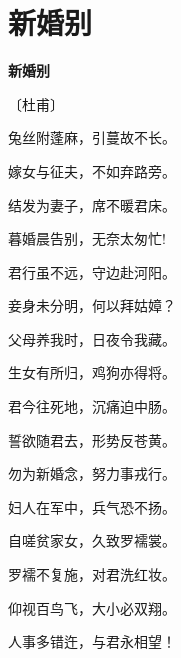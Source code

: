 \documentclass[12pt,UTF-8,openany,fontset=none]{ctexbook}
\begin{document}
\vspace{8pt}
\clearpage

\section{新婚别}


\begin{center}
    {\bfseries 新婚别}

    \vspace{18pt}

    \begin{large}\xuwen
        〔杜甫〕
    \end{large}

\end{center}

    \vspace{18pt}  %

\begin{center}
    \begin{Large}

        兔丝附蓬麻，引蔓故不长。

        嫁女与征夫，不如弃路旁。

        结发为妻子，席不暖君床。

        暮婚晨告别，无奈太匆忙!

        君行虽不远，守边赴河阳。

        妾身未分明，何以拜姑嫜？

        父母养我时，日夜令我藏。

        生女有所归，鸡狗亦得将。

        君今往死地，沉痛迫中肠。

        誓欲随君去，形势反苍黄。

        勿为新婚念，努力事戎行。

        妇人在军中，兵气恐不扬。

        自嗟贫家女，久致罗襦裳。

        罗襦不复施，对君洗红妆。

        仰视百鸟飞，大小必双翔。

        人事多错迕，与君永相望！

    \end{Large}

\end{center}

\vspace{8pt}
\clearpage
\end{document}
